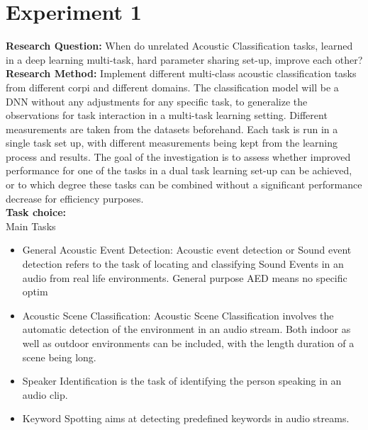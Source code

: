 \section{Experiment 1}
	
	\textbf{Research Question:} When do unrelated Acoustic Classification tasks, learned in a deep learning multi-task, hard parameter sharing set-up, improve each other? \\
	\textbf{Research Method:} Implement different multi-class acoustic classification tasks from different corpi and different domains. The classification model will be a DNN without any adjustments for any specific task, to generalize the observations for task interaction in a multi-task learning setting. Different measurements are taken from the datasets beforehand. Each task is run in a single task set up, with different measurements being kept from the learning process and results. The goal of the investigation is to assess whether improved performance for one of the tasks in a dual task learning set-up can be achieved, or to which degree these tasks can be combined without a significant performance decrease for efficiency purposes.\\
	
	\textbf{Task choice:}\\
	
	Main Tasks\\
	
	\begin{itemize}
		\item General Acoustic Event Detection: Acoustic event detection or Sound event detection refers to the task of locating and classifying Sound Events in an audio from real life environments. General purpose AED means no specific optim
		\item Acoustic Scene Classification: Acoustic Scene Classification involves the automatic detection of the environment in an audio stream. Both indoor as well as outdoor environments can be included, with the length duration of a scene being long.
		\item Speaker Identification is the task of identifying the person speaking in an audio clip.
		\item Keyword Spotting aims at detecting predefined keywords in audio streams.
	\end{itemize}


